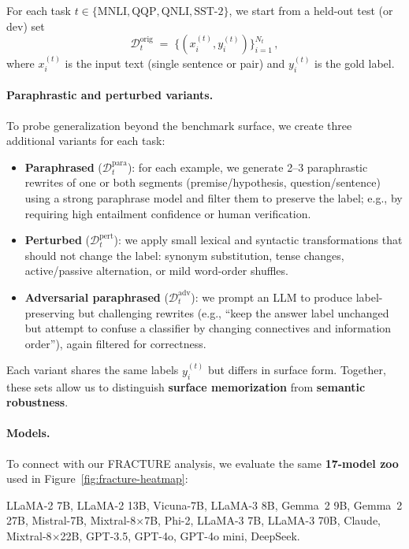 For each task $t \in \{\text{MNLI},\text{QQP},\text{QNLI},\text{SST-2}\}$,
we start from a held-out test (or dev) set
\[
  \mathcal{D}_t^{\text{orig}} 
  \;=\; \{(x_i^{(t)}, y_i^{(t)})\}_{i=1}^{N_t}\,,
\]
where $x_i^{(t)}$ is the input text (single sentence or pair) and
$y_i^{(t)}$ is the gold label.

\paragraph{Paraphrastic and perturbed variants.}
To probe generalization beyond the benchmark surface, we create three
additional variants for each task:

\begin{itemize}[leftmargin=1.5em]
  \item \textbf{Paraphrased} ($\mathcal{D}_t^{\text{para}}$): for each
        example, we generate 2--3 paraphrastic rewrites of one or both
        segments (premise/hypothesis, question/sentence) using a strong
        paraphrase model and filter them to preserve the label; e.g.,
        by requiring high entailment confidence or human verification.
  \item \textbf{Perturbed} ($\mathcal{D}_t^{\text{pert}}$): we apply
        small lexical and syntactic transformations that should not
        change the label: synonym substitution, tense changes,
        active/passive alternation, or mild word-order shuffles.
  \item \textbf{Adversarial paraphrased} ($\mathcal{D}_t^{\text{adv}}$):
        we prompt an LLM to produce label-preserving but challenging
        rewrites (e.g., ``keep the answer label unchanged but attempt to
        confuse a classifier by changing connectives and information
        order''), again filtered for correctness.
\end{itemize}

Each variant shares the same labels $y_i^{(t)}$ but differs in surface
form. Together, these sets allow us to distinguish \textbf{surface
memorization} from \textbf{semantic robustness}.

\paragraph{Models.}
To connect with our FRACTURE analysis, we evaluate the same
\textbf{17-model zoo} used in Figure~\ref{fig:fracture-heatmap}:

\begin{center}
\small
LLaMA-2 7B,
LLaMA-2 13B,
Vicuna-7B,
LLaMA-3 8B,
Gemma~2 9B,
Gemma~2 27B,
Mistral-7B,
Mixtral-8$\times$7B,
Phi-2,
LLaMA-3 7B,
LLaMA-3 70B,
Claude,
Mixtral-8$\times$22B,
GPT-3.5,
GPT-4o,
GPT-4o mini,
DeepSeek.
\end{center}



